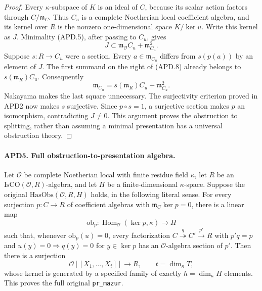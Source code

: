 \documentclass[11pt,a4paper]{article}
\numberwithin{equation}{section}
\theoremstyle{remark}\newtheorem{remark}[theorem]{Remark}
\begin{document}
\begin{proof}
Every \(\kappa\)-subspace of \(K\) is an ideal of \(C\),
because its scalar action factors through \(C/\mathfrak m_C\).
Thus \(C_u\) is a complete Noetherian local coefficient algebra,
and its kernel over \(R\) is the nonzero one-dimensional space
\(K/\ker u\).  Write this kernel as \(J\).
Minimality (APD.5), after passing to \(C_u\), gives
\[
 J\subset\mathfrak m_{\mathcal O}C_u+\mathfrak m_{C_u}^2.
                                                               \tag{APD.8}
\]
Suppose \(s:R\to C_u\) were a section.  Every
\(a\in\mathfrak m_{C_u}\) differs from \(s(p(a))\) by an
element of \(J\).  The first summand on the right of (APD.8)
already belongs to \(s(\mathfrak m_R)C_u\).  Consequently
\[
 \mathfrak m_{C_u}=s(\mathfrak m_R)C_u+\mathfrak m_{C_u}^2.
\]
Nakayama makes the last square unnecessary.  The surjectivity
criterion proved in APD2 now makes \(s\) surjective.  Since
\(p\circ s=1\), a surjective section makes \(p\) an
isomorphism, contradicting \(J\ne0\).  This argument proves
the obstruction to splitting, rather than assuming a minimal
presentation has a universal obstruction theory.
\end{proof}

\paragraph{APD5. Full obstruction-to-presentation algebra.}
\label{claim:APD5}
Let \(\mathcal O\) be complete Noetherian local with finite
residue field \(\kappa\), let \(R\) be an
\(\mathrm{IsCO}(\mathcal O,R)\)-algebra, and let \(H\) be
a finite-dimensional \(\kappa\)-space.  Suppose the original
\(\mathrm{HasObs}(\mathcal O,R,H)\) holds, in the following
literal sense.  For every surjection \(p:C\to R\) of coefficient
algebras with \(\mathfrak m_C\ker p=0\), there is a linear map
\[
 \mathrm{ob}_p:\operatorname{Hom}_{\mathcal O}(\ker p,\kappa)
                      \longrightarrow H                 \tag{APD.9}
\]
such that, whenever \(\mathrm{ob}_p(u)=0\), every factorization
\(C\overset q\twoheadrightarrow C'\overset{p'}\longrightarrow R\)
with \(p'q=p\) and
\(u(y)=0\Rightarrow q(y)=0\) for \(y\in\ker p\)
has an \(\mathcal O\)-algebra section of \(p'\).
Then there is a surjection
\[
 \mathcal O[[X_1,\ldots,X_t]]\longrightarrow R,
 \qquad t=\dim_\kappa T,
                                                               \tag{APD.10}
\]
whose kernel is generated by a specified family of exactly
\(h=\dim_\kappa H\) elements.  This proves the full original
\texttt{pr\_\allowbreak mazur}.
\end{document}
